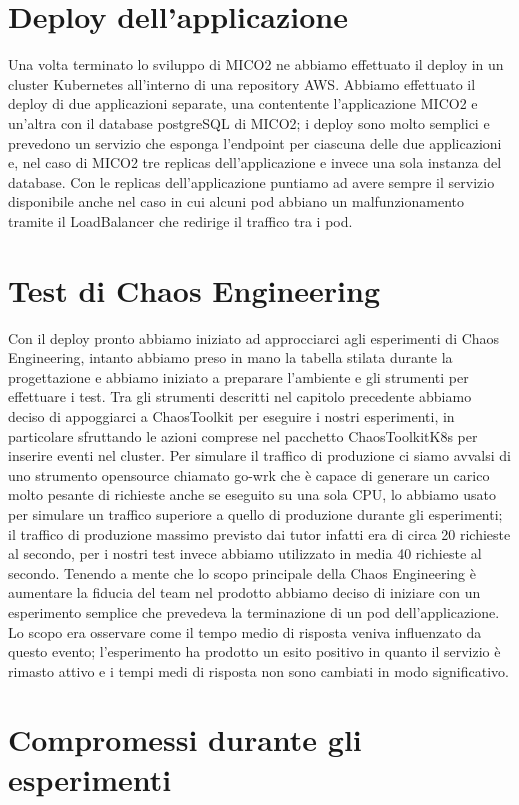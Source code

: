 \section{Deploy dell'applicazione}
Una volta terminato lo sviluppo di MICO2 ne abbiamo effettuato il deploy in un cluster Kubernetes all'interno di una repository AWS.
Abbiamo effettuato il deploy di due applicazioni separate, una contentente l'applicazione MICO2 e un'altra con il database postgreSQL di MICO2; i deploy sono molto semplici e prevedono un servizio che esponga l'endpoint per ciascuna delle due applicazioni e, nel caso di MICO2 tre \gls{replicas} dell'applicazione e invece una sola instanza del database.
Con le replicas dell'applicazione puntiamo ad avere sempre il servizio disponibile anche nel caso in cui alcuni pod abbiano un malfunzionamento tramite il LoadBalancer che redirige il traffico tra i pod.

\section{Test di Chaos Engineering}
Con il deploy pronto abbiamo iniziato ad approcciarci agli esperimenti di Chaos Engineering, intanto abbiamo preso in mano la tabella stilata durante la progettazione e abbiamo iniziato a preparare l'ambiente e gli strumenti per effettuare i test.
Tra gli strumenti descritti nel capitolo precedente abbiamo deciso di appoggiarci a ChaosToolkit per eseguire i nostri esperimenti, in particolare sfruttando le azioni comprese nel pacchetto ChaosToolkitK8s per inserire eventi nel cluster.
Per simulare il traffico di produzione ci siamo avvalsi di uno strumento opensource chiamato \gls{go-wrk} che è capace di generare un carico molto pesante di richieste anche se eseguito su una sola CPU, lo abbiamo usato per simulare un traffico superiore a quello di produzione durante gli esperimenti; il traffico di produzione massimo previsto dai tutor infatti era di circa 20 richieste al secondo, per i nostri test invece abbiamo utilizzato in media 40 richieste al secondo.
Tenendo a mente che lo scopo principale della Chaos Engineering è aumentare la fiducia del team nel prodotto abbiamo deciso di iniziare con un esperimento semplice che prevedeva la terminazione di un pod dell'applicazione.
Lo scopo era osservare come il tempo medio di risposta veniva influenzato da questo evento; l'esperimento ha prodotto un esito positivo in quanto il servizio è rimasto attivo e i tempi medi di risposta non sono cambiati in modo significativo.

\section{Compromessi durante gli esperimenti}


